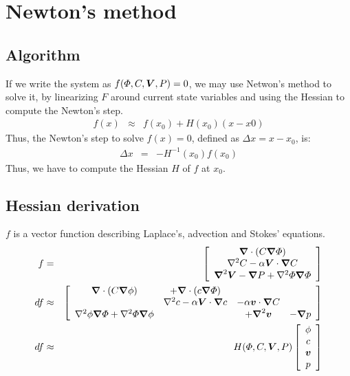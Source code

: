 \section{Newton's method}
\subsection{Algorithm}
If we write the system as $f(\varPhi,C,\boldsymbol{V},P) = 0$, we may use Netwon's method to solve it, by linearizing $F$ around current state variables
and using the Hessian to compute the Newton's step.
\begin{eqnarray}
  f(x) &\approx & f(x_0) + H(x_0) (x - x0)
\end{eqnarray}
Thus, the Newton's step to solve $f(x) = 0$, 
defined as $\Delta x = x - x_0$, is:
\begin{eqnarray}
  \Delta x &=& -H^{-1}(x_0) f(x_0)
\end{eqnarray}
Thus, we have to compute the Hessian $H$ of $f$ at $x_0$.

\subsection{Hessian derivation}
$f$ is a vector function describing Laplace's, advection and Stokes'
equations.
\begin{eqnarray}
  f &=& \left[\begin{array}{c}
  \boldsymbol{\nabla} \cdot (C \boldsymbol{\nabla} \varPhi) \\
  \nabla^2 C - \alpha \boldsymbol{V} \cdot \boldsymbol{\nabla} C \\
  \boldsymbol{\nabla}^2 \boldsymbol{V} - \boldsymbol{\nabla} P + \nabla^2 \varPhi \boldsymbol{\nabla} \varPhi
  \end{array}\right]
  \\
  df & \approx & \left[\begin{array}{cccc}
  \boldsymbol{\nabla} \cdot (C \boldsymbol{\nabla} \phi) &+ \boldsymbol{\nabla} \cdot (c \boldsymbol{\nabla} \varPhi) & & \\
  &\nabla^2 c - \alpha \boldsymbol{V} \cdot \boldsymbol{\nabla} c &- \alpha \boldsymbol{v} \cdot \boldsymbol{\nabla} C&\\
  \nabla^2 \phi \boldsymbol{\nabla} \varPhi +
  \nabla^2 \varPhi \boldsymbol{\nabla} \phi &
  & +\boldsymbol{\nabla}^2 \boldsymbol{v} &- \boldsymbol{\nabla} p
  \end{array}\right] \\
  df & \approx & H(\varPhi,C,\boldsymbol{V},P) \left[\begin{array}{c}
  \phi \\ c \\ \boldsymbol{v} \\ p
  \end{array}\right]
\end{eqnarray}

